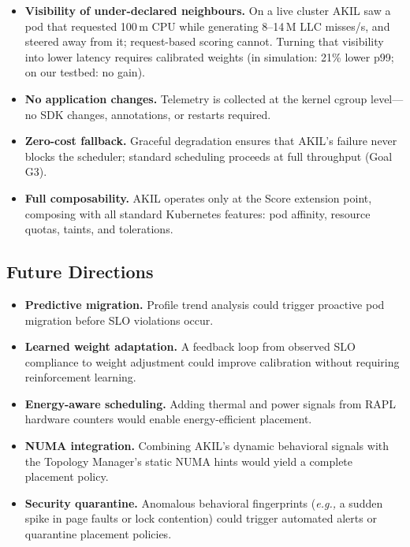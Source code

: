 \documentclass[10pt,conference,a4paper]{IEEEtran}
\newcommand{\akil}{\textsc{AKIL}\xspace}
\newcommand{\sys}{\akil}
\newcommand{\eg}{\emph{e.g.,}\xspace}
\begin{document}
\begin{itemize}[leftmargin=*,topsep=2pt,itemsep=1pt]
  \item \textbf{Visibility of under-declared neighbours.} On a live cluster \sys saw a pod
        that requested 100\,m CPU while generating 8--14\,M LLC misses/s, and steered away
        from it; request-based scoring cannot. Turning that visibility into lower latency
        requires calibrated weights (in simulation: 21\% lower p99; on our testbed: no gain).
  \item \textbf{No application changes.} Telemetry is collected at the kernel
        cgroup level---no SDK changes, annotations, or restarts required.
  \item \textbf{Zero-cost fallback.} Graceful degradation ensures that AKIL's
        failure never blocks the scheduler; standard scheduling proceeds at full
        throughput (Goal G3).
  \item \textbf{Full composability.} AKIL operates only at the Score extension
        point, composing with all standard Kubernetes features: pod affinity,
        resource quotas, taints, and tolerations.
\end{itemize}

\subsection{Future Directions}

\begin{itemize}[leftmargin=*,topsep=2pt,itemsep=1pt]
  \item \textbf{Predictive migration.} Profile trend analysis could trigger
        proactive pod migration before SLO violations occur.
  \item \textbf{Learned weight adaptation.} A feedback loop from observed SLO
        compliance to weight adjustment could improve calibration without
        requiring reinforcement learning.
  \item \textbf{Energy-aware scheduling.} Adding thermal and power signals from
        RAPL hardware counters would enable energy-efficient placement.
  \item \textbf{NUMA integration.} Combining AKIL's dynamic behavioral signals
        with the Topology Manager's static NUMA hints would yield a complete
        placement policy.
  \item \textbf{Security quarantine.} Anomalous behavioral fingerprints (\eg a
        sudden spike in page faults or lock contention) could trigger automated
        alerts or quarantine placement policies.
\end{itemize}
\end{document}
